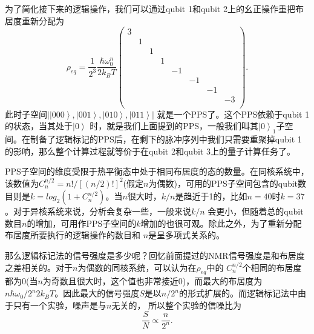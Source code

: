 为了简化接下来的逻辑操作，我们可以通过qubit 1和qubit 2上的幺正操作重把布居度重新分配为
 \begin{equation}\label{aaa}
\rho_{eq} = \frac{1}{2^3}\frac{\hbar \omega_0^n}{2k_BT}\left(
                                                         \begin{array}{cccccccc}
                                                           3 &  &  &  &  &  &  &  \\
                                                            & 1 &   &   &   &   &   &   \\
                                                             &   & 1 &   &   &   &   &   \\
                                                             &   &   & 1 &   &   &   &   \\
                                                             &   &   &   & -1 &   &   &   \\
                                                             &   &   &   &   & -1 &   &   \\
                                                             &   &   &   &   &   & -1 &   \\
                                                             &   &   &   &   &   &   & -3 \\
                                                         \end{array}
                                                       \right).
\end{equation}
此时子空间$|{ \left\vert 000 \right \rangle, \left\vert 001 \right \rangle, \left\vert 010 \right \rangle, \left\vert 011 \right \rangle|}$ 就是一个PPS了。这个PPS依赖于qubit 1的状态，当其处于$\left\vert 0 \right \rangle$ 时，就是我们上面提到的PPS，一般我们叫其$\left\vert 0 \right \rangle_1$子空间。在制备了逻辑标记的PPS后，在剩下的脉冲序列中我们只需要重聚掉qubit 1的影响，那么整个计算过程就等价于在qubit 2和qubit 3上的量子计算任务了。

PPS子空间的维度受限于热平衡态中处于相同布居度的态的数量。在同核系统中，该数值为$C_n^{n/2} = n!/[(n/2)!]^2$(假定$n$为偶数)，可用的PPS子空间包含的qubit数目则是$k = log_2(1+C_n^{n/2})$。当$n$很大时，$k/n$是趋近于1的，比如$n=40$时$k=37$。对于异核系统来说，分析会复杂一些，一般来说$k/n$
会更小，但随着总的qubit数目$n$的增加，可用作PPS子空间的$k$增加的也很可观。除此之外，为了重新分配布居度所要执行的逻辑操作的数目和
$n$是呈多项式关系的。

那么逻辑标记法的信号强度是多少呢？回忆前面提过的NMR信号强度是和布居度之差相关的。对于$n$为偶数的同核系统，可以认为在$\rho_{eq}$中的 $C_n^{n/2} $个相同的布居度都为0(当$n$为奇数且很大时，这个值也非常接近0)，而最大的布居度为$n\hbar \omega_0/2^n2k_BT$。因此最大的信号强度$S$是以$n/2^n$的形式扩展的。而逻辑标记法中由于只有一个实验，噪声是与$n$无关的，
所以整个实验的信噪比为
\begin{equation}\label{aaa}
\frac{S}{N}\propto \frac{n}{2^n}.
\end{equation}

